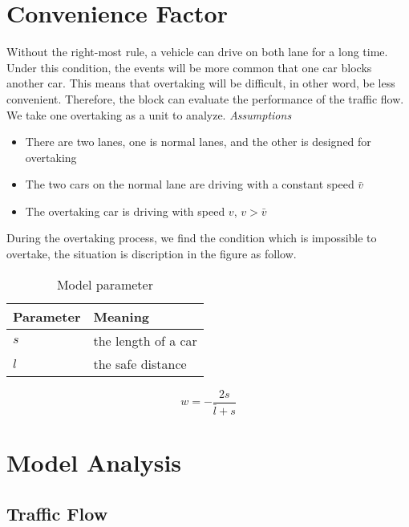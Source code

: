 \section{Convenience Factor}\label{sec: Convenience Factor}
Without the right-most rule, a vehicle can drive on both lane for a long time. Under this condition, the events will be more common that one car blocks another car. This means that overtaking will be difficult,
in other word, be less convenient. Therefore, the block can evaluate the performance of the traffic flow.
We take one overtaking as a unit to
analyze. 
\emph{Assumptions}
\begin{itemize}
\item There are two lanes, one is normal lanes,
and the other is designed for overtaking
\item The two cars on the normal lane are driving
with a constant speed $\bar{v}$
\item The overtaking car is driving with speed
$v$, $v > \bar{v}$
\end{itemize}

During the overtaking
process, we find the condition which
is impossible to overtake, the situation
is discription in the figure as follow.

\begin{table}
\centering
\begin{tabular}{ll}
\hline
Parameter & Meaning\\
\hline
$s$ & the length of a car \\
$l$ & the safe distance \\
\hline
\end{tabular}
\caption{Model parameter}
\end{table}

\begin{equation}
w = - \frac{2s}{\bar{l} + s} 
\end{equation}
  

\section{Model Analysis}

\subsection{Traffic Flow}
